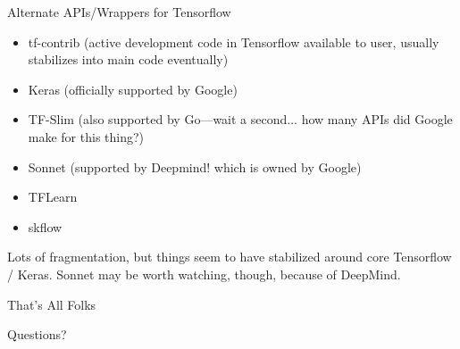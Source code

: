 \documentclass[]{beamer}
\begin{document}
\begin{frame}{Alternate APIs/Wrappers for Tensorflow}

\begin{itemize}
\item tf-contrib (active development code in Tensorflow available to user, usually stabilizes into main code eventually)
\item Keras (officially supported by Google)
\item TF-Slim (also supported by Go---wait a second... how many APIs did Google make for this thing?)
\item Sonnet (supported by Deepmind! which is owned by Google)
\item TFLearn
\item skflow
\end{itemize}

Lots of fragmentation, but things seem to have stabilized around core Tensorflow / Keras. Sonnet may be worth watching, though, because of DeepMind. 

\end{frame}

\begin{frame}{That's All Folks}

Questions?

\end{frame}
\end{document}
